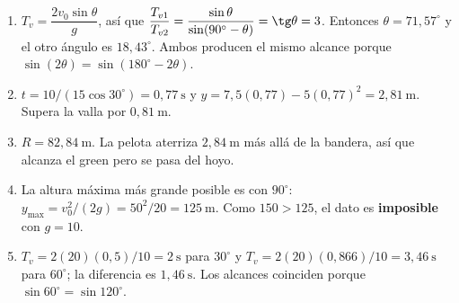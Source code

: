 \documentclass[12pt, letterpaper]{article}
\providecommand{\sen}{\sin}
\begin{document}
\begin{enumerate}[leftmargin=*, label=\textbf{\arabic*.}, start=29]
        $y=17{,}32(3)-5(3)^2=6{,}96\ \text{m}$, que supera los $6\ \text{m}$
        por $0{,}96\ \text{m}$. La pelota sigue en el aire porque
        $T_v=3{,}46\ \text{s}$.
  \item $T_v=\dfrac{2v_0\sen\theta}{g}$, así que
        $\dfrac{T_{v1}}{T_{v2}}=\dfrac{\sen\theta}{\sen(90^\circ-\theta)}
        =\tg\theta=3$. Entonces $\theta=71{,}57^\circ$ y el otro ángulo es
        $18{,}43^\circ$. Ambos producen el mismo alcance porque
        $\sen(2\theta)=\sen(180^\circ-2\theta)$.
  \item $t=10/(15\cos30^\circ)=0{,}77\ \text{s}$ y
        $y=7{,}5(0{,}77)-5(0{,}77)^2=2{,}81\ \text{m}$. Supera la valla por
        $0{,}81\ \text{m}$.
  \item $R=82{,}84\ \text{m}$. La pelota aterriza $2{,}84\ \text{m}$ más
        allá de la bandera, así que alcanza el green pero se pasa del hoyo.
  \item La altura máxima más grande posible es con $90^\circ$:
        $y_{\max}=v_0^2/(2g)=50^2/20=125\ \text{m}$. Como
        $150>125$, el dato es \textbf{imposible} con $g=10$.
  \item $T_v=2(20)(0{,}5)/10=2\ \text{s}$ para $30^\circ$ y
        $T_v=2(20)(0{,}866)/10=3{,}46\ \text{s}$ para $60^\circ$; la
        diferencia es $1{,}46\ \text{s}$. Los alcances coinciden porque
        $\sen60^\circ=\sen120^\circ$.
\end{enumerate}
\end{document}
